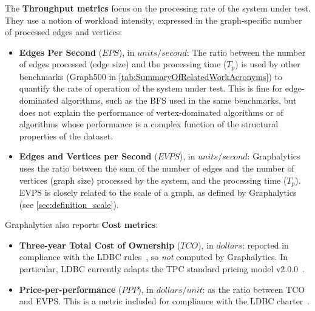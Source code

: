 The {\bf Throughput metrics} focus on the processing rate of the system under test. They use a notion of workload intensity, expressed in the graph-specific number of processed edges and vertices:
\begin{itemize}
	\item {\bf Edges Per Second} ($\textit{EPS}$), in $\textit{units} / \textit{second}$: The ratio between the number of edges processed (edge size) and the processing time ($T_p$) is used by other benchmarks (Graph500 in \autoref{tab:SummaryOfRelatedWorkAcronyms}) to quantify the rate of operation of the system under test. This is fine for edge-dominated algorithms, such as the BFS used in the same benchmarks, but does not explain the performance of vertex-dominated algorithms or of algorithms whose performance is a complex function of the structural properties of the dataset.
	
	\item {\bf Edges and Vertices per Second} ($\textit{EVPS}$), in $\textit{units} / \textit{second}$: Graphalytics uses the ratio between the sum of the number of edges and the number of vertices (graph size) processed by the system, and the processing time ($T_p$). EVPS is closely related to the scale of a graph, as defined by Graphalytics (see \autoref{sec:definition_scale}).
\end{itemize}

Graphalytics also reports {\bf Cost metrics}:

\begin{itemize}
	\item {\bf Three-year Total Cost of Ownership} ($\textit{TCO}$), in $\textit{dollars}$: reported in compliance with the LDBC rules~\cite{ldbc_byelaws}, so {\it not} computed by Graphalytics. In particular, LDBC currently adapts the TPC standard pricing model v2.0.0~\cite{tpc_pricing}.
	
	\item {\bf Price-per-performance} ($\textit{PPP}$), in $\textit{dollars} / \textit{unit}$: as the ratio between TCO and EVPS. This is a metric included for compliance with the LDBC charter~\cite{ldbc_byelaws}.

	

\end{itemize}



